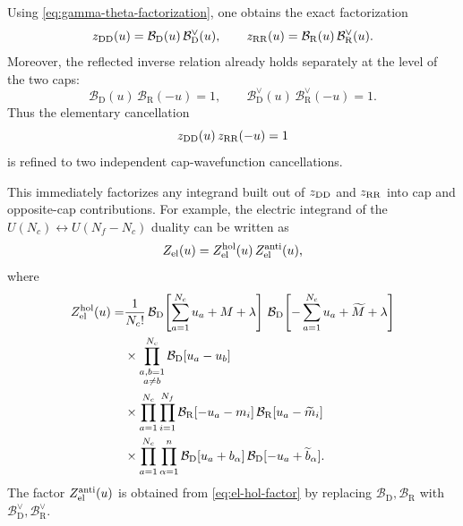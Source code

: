 \documentclass[11pt,a4paper]{article}
\numberwithin{equation}{section}
\theoremstyle{plain}
\theoremstyle{definition}
\theoremstyle{remark}
\begin{document}
Using \eqref{eq:gamma-theta-factorization}, one obtains the exact factorization
\begin{equation}
z_{\rm DD}(u)
=
\mathcal B_{\mathrm D}(u)\,
\mathcal B_{\mathrm D}^{\vee}(u),
\qquad
z_{\rm RR}(u)
=
\mathcal B_{\mathrm R}(u)\,
\mathcal B_{\mathrm R}^{\vee}(u).
\label{eq:4d-block-factorization}
\end{equation}
Moreover, the reflected inverse relation already holds separately at the level of the two caps:
\begin{equation}
\mathcal B_{\mathrm D}(u)\,
\mathcal B_{\mathrm R}(-u)=1,
\qquad
\mathcal B_{\mathrm D}^{\vee}(u)\,
\mathcal B_{\mathrm R}^{\vee}(-u)=1.
\label{eq:4d-half-block-inverse}
\end{equation}
Thus the elementary cancellation
\begin{equation}
z_{\rm DD}(u)\,z_{\rm RR}(-u)=1
\end{equation}
is refined to two independent cap-wavefunction cancellations.

This immediately factorizes any integrand built out of \(z_{\rm DD}\) and \(z_{\rm RR}\) into cap and opposite-cap contributions. For example, the electric integrand of the \(U(N_c)\leftrightarrow U(N_f-N_c)\) duality can be written as
\begin{equation}
Z_{\rm el}(u)
=
Z_{\rm el}^{\rm hol}(u)\,
Z_{\rm el}^{\rm anti}(u),
\label{eq:el-factorization}
\end{equation}
where
\begin{equation}
\begin{aligned}
Z_{\rm el}^{\rm hol}(u)
=&\frac{1}{N_c!}\,
\mathcal B_{\mathrm D}\!\left[\sum_{a=1}^{N_c}u_a+M+\lambda\right]\,
\mathcal B_{\mathrm D}\!\left[-\sum_{a=1}^{N_c}u_a+\widetilde M+\lambda\right]
\\
&\times
\prod_{\substack{a,b=1\\ a\neq b}}^{N_c}
\mathcal B_{\mathrm D}[u_a-u_b]
\\
&\times
\prod_{a=1}^{N_c}\prod_{i=1}^{N_f}
\mathcal B_{\mathrm R}[-u_a-m_i]\,
\mathcal B_{\mathrm R}[u_a-\widetilde m_i]
\\
&\times
\prod_{a=1}^{N_c}\prod_{\alpha=1}^{n}
\mathcal B_{\mathrm D}[u_a+b_\alpha]\,
\mathcal B_{\mathrm D}[-u_a+\widetilde b_\alpha].
\end{aligned}
\label{eq:el-hol-factor}
\end{equation}
The factor \(Z_{\rm el}^{\rm anti}(u)\) is obtained from \eqref{eq:el-hol-factor} by replacing \(\mathcal B_{\mathrm D},\mathcal B_{\mathrm R}\) with \(\mathcal B_{\mathrm D}^{\vee},\mathcal B_{\mathrm R}^{\vee}\).
\end{document}

